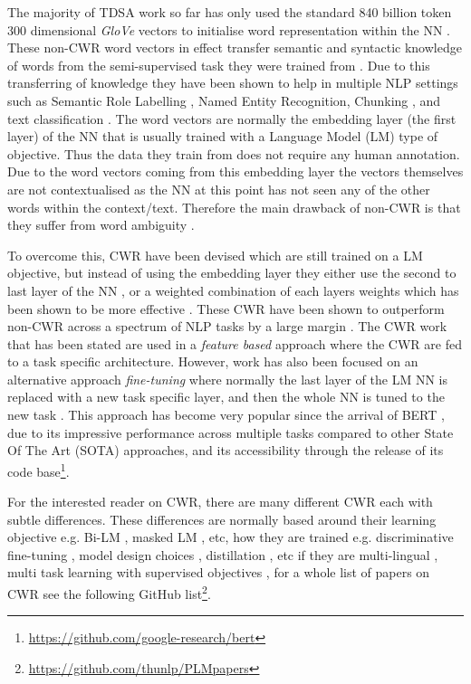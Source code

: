 The majority of TDSA work so far has only used the standard 840 billion token 300 dimensional \textit{GloVe} vectors \citep{vectors_pennington_2014} to initialise word representation within the NN \citep{methods_tang-etal-2016-aspect,methods_tang-etal-2019-progressive}. These non-CWR word vectors in effect transfer semantic and syntactic knowledge of words from the semi-supervised task they were trained from \citep{vectors_Mikolov2013EfficientEO}. Due to this transferring of knowledge they have been shown to help in multiple NLP settings such as Semantic Role Labelling \citep{vectors_collobert2008unified}, Named Entity Recognition, Chunking \citep{vectors_turian-etal-2010-word}, and text classification \citep{vectors_kim-2014-convolutional}. The word vectors are normally the embedding layer (the first layer) of the NN that is usually trained with a Language Model (LM) type of objective. Thus the data they train from does not require any human annotation. Due to the word vectors coming from this embedding layer the vectors themselves are not contextualised as the NN at this point has not seen any of the other words within the context/text. Therefore the main drawback of non-CWR is that they suffer from word ambiguity \citep{vectors_camacho2018word}. 

To overcome this, CWR have been devised which are still trained on a LM objective, but instead of using the embedding layer they either use the second to last layer of the NN \citep{vectors_peters-etal-2017-semi}, or a weighted combination of each layers weights which has been shown to be more effective \citep{vectors_peters-etal-2018-deep}. These CWR have been shown to outperform non-CWR across a spectrum of NLP tasks by a large margin \citep{vectors_liu-etal-2019-linguistic}. The CWR work that has been stated are used in a \textit{feature based} approach where the CWR are fed to a task specific architecture. However, work has also been focused on an alternative approach \textit{fine-tuning} where normally the last layer of the LM NN is replaced with a new task specific layer, and then the whole NN is tuned to the new task \citep{vectors_Radford2018ImprovingLU, vectors_howard-ruder-2018-universal}. This approach has become very popular since the arrival of BERT \citep{vectors_devlin-etal-2019-bert}, due to its impressive performance across multiple tasks compared to other State Of The Art (SOTA) approaches, and its accessibility through the release of its code base\footnote{\url{https://github.com/google-research/bert}}. 

For the interested reader on CWR, there are many different CWR each with subtle differences. These differences are normally based around their learning objective e.g. Bi-LM \citep{vectors_peters-etal-2018-deep}, masked LM \citep{vectors_devlin-etal-2019-bert}, etc, how they are trained e.g. discriminative fine-tuning \citep{vectors_howard-ruder-2018-universal}, model design choices \citep{vectors_liu2019roberta}, distillation \citep{vectors_tsai2019small}, etc if they are multi-lingual \citep{vectors_lample2019cross}, multi task learning with supervised objectives \citep{vectors_liu-etal-2019-multi}, for a whole list of papers on CWR see the following GitHub list\footnote{\url{https://github.com/thunlp/PLMpapers}}.

